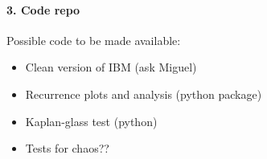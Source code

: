 \paragraph*{3. Code repo}

Possible code to be made available:

\begin{itemize}
	\item Clean version of IBM (ask Miguel)
	\item Recurrence plots and analysis (python package)
	\item Kaplan-glass test (python)
	\item Tests for chaos??
\end{itemize}






